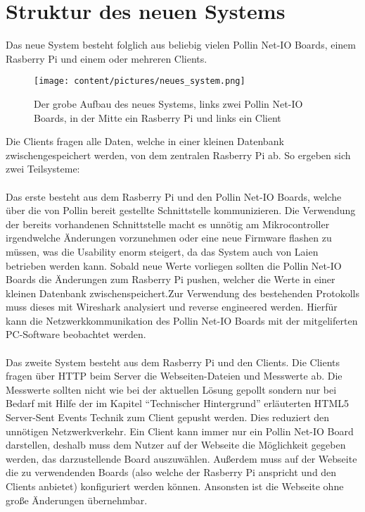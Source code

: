 \section{Struktur des neuen Systems}
Das neue System besteht folglich aus beliebig vielen Pollin Net-IO Boards, einem
Rasberry Pi und einem oder mehreren Clients. 
\begin{figure}[H]
\centering
\texttt{[image: content/pictures/neues\_system.png]}
\caption[Schematischer Aufbau der Erweiterung]{Der grobe Aufbau des neues
Systems, links zwei Pollin Net-IO Boards, in der Mitte ein Rasberry Pi und links ein Client}
\label{struktur}
\end{figure}
Die Clients fragen alle Daten, welche in einer kleinen Datenbank
zwischengespeichert werden, von dem zentralen Rasberry Pi ab. So ergeben
sich zwei Teilsysteme: \\
\\
Das erste besteht aus dem Rasberry Pi und den Pollin Net-IO Boards,
welche über die von Pollin bereit gestellte Schnittstelle kommunizieren.
Die Verwendung der bereits vorhandenen Schnittstelle macht es unnötig am
Mikrocontroller irgendwelche Änderungen vorzunehmen oder eine neue Firmware
flashen zu müssen, was die Usability enorm steigert, da das System auch von
Laien betrieben werden kann. Sobald neue Werte vorliegen sollten die Pollin
Net-IO Boards die Änderungen zum Rasberry Pi pushen, welcher die Werte in einer
kleinen Datenbank zwischenspeichert.Zur Verwendung des bestehenden Protokolls 
muss dieses mit Wireshark analysiert und reverse engineered werden. Hierfür 
kann die Netzwerkkommunikation des Pollin Net-IO Boards mit der mitgeliferten 
PC-Software beobachtet werden.\\
\\
Das zweite System besteht aus dem Rasberry Pi und den Clients. Die Clients
fragen über HTTP beim Server die Webseiten-Dateien und Messwerte ab. Die
Messwerte sollten nicht wie bei der aktuellen Lösung gepollt sondern nur bei
Bedarf mit Hilfe der im Kapitel "`Technischer Hintergrund"' erläuterten HTML5
Server-Sent Events Technik zum Client gepusht werden. Dies reduziert den
unnötigen Netzwerkverkehr. Ein Client kann immer nur ein Pollin Net-IO Board
darstellen, deshalb muss dem Nutzer auf der Webseite die Möglichkeit gegeben
werden, das darzustellende Board auszuwählen. Außerdem muss auf der Webseite die
zu verwendenden Boards (also welche der Rasberry Pi anspricht und den Clients
anbietet) konfiguriert werden können. Ansonsten ist die Webseite ohne große
Änderungen übernehmbar.

